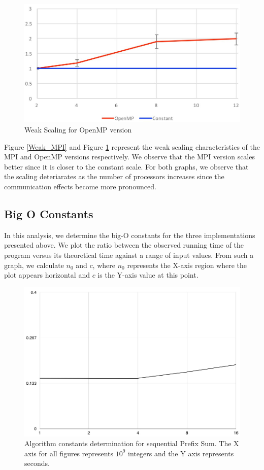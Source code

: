 \documentclass[11pt]{article}
\begin{document}
\begin{figure}[h!]
    \centering
        \includegraphics[scale=0.24]{Weak_OpenMP.jpg}
        \caption{Weak Scaling for OpenMP version}
        \label{Weak_OpenMP}
    \centering
\end{figure}

Figure \ref{Weak_MPI} and Figure \ref{Weak_OpenMP} represent the weak scaling characteristics of the MPI and OpenMP versions respectively. We observe that the MPI version scales better since it is closer to the constant scale. For both graphs, we observe that the scaling deteriarates as the number of processors increases since the communication effects become more pronounced. 

\subsection{Big O Constants}

In this analysis, we determine the big-O constants for the three implementations presented above. We plot the ratio between the observed running time of the program versus its theoretical time against a range of input values. From such a graph, we calculate $n_{0}$ and $c$, where $n_{0}$ represents the X-axis region where the plot appears horizontal and $c$ is the Y-axis value at this point. 

\begin{figure}[h!]
    \centering
        \includegraphics[scale=0.20]{s_1.jpg}
        \caption{Algorithm constants determination for sequential Prefix Sum. The X axis for all figures represents $10^{9}$ integers and the Y axis represents seconds.}
        \label{Seq_c}
    \centering
\end{figure}
\end{document}
